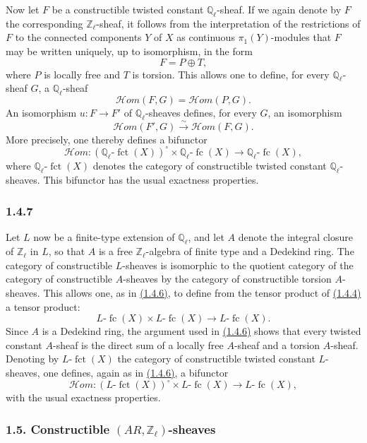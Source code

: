 \documentclass[11pt]{article}
\providecommand{\fct}{\operatorname{fct}}
\providecommand{\cHom}{\mathcal{H}om}
\providecommand{\fc}{\operatorname{fc}}
\begin{document}
Now let \(F\) be a constructible twisted constant \(\mathbb Q_\ell\)-sheaf. If we again denote by \(F\) the corresponding \(\mathbb Z_\ell\)-sheaf, it follows from the interpretation of the restrictions of \(F\) to the connected components \(Y\) of \(X\) as continuous \(\pi_1(Y)\)-modules that \(F\) may be written uniquely, up to isomorphism, in the form
\[
F=P\oplus T,
\]
where \(P\) is locally free and \(T\) is torsion. This allows one to define, for every \(\mathbb Q_\ell\)-sheaf \(G\), a \(\mathbb Q_\ell\)-sheaf
\[
\cHom(F,G)=\cHom(P,G).
\]
An isomorphism \(u:F\to F'\) of \(\mathbb Q_\ell\)-sheaves defines, for every \(G\), an isomorphism
\[
\cHom(F',G)\xrightarrow{\sim}\cHom(F,G).
\]
More precisely, one thereby defines a bifunctor
\[
\cHom:(\mathbb Q_\ell\text{-}\fct(X))^\circ\times \mathbb Q_\ell\text{-}\fc(X)
\longrightarrow \mathbb Q_\ell\text{-}\fc(X),
\]
where \(\mathbb Q_\ell\text{-}\fct(X)\) denotes the category of constructible twisted constant \(\mathbb Q_\ell\)-sheaves. This bifunctor has the usual exactness properties.

\subsubsection*{1.4.7}\label{sga5:VI:subsubsection:1.4.7}
Let \(L\) now be a finite-type extension of \(\mathbb Q_\ell\), and let \(A\) denote the integral closure of \(\mathbb Z_\ell\) in \(L\), so that \(A\) is a free \(\mathbb Z_\ell\)-algebra of finite type and a Dedekind ring. The category of constructible \(L\)-sheaves is isomorphic to the quotient category of the category of constructible \(A\)-sheaves by the category of constructible torsion \(A\)-sheaves. This allows one, as in \hyperref[sga5:VI:subsubsection:1.4.6]{(1.4.6)}, to define from the tensor product of \hyperref[sga5:VI:subsubsection:1.4.4]{(1.4.4)} a tensor product:
\[
L\text{-}\fc(X)\times L\text{-}\fc(X)\longrightarrow L\text{-}\fc(X).
\]
Since \(A\) is a Dedekind ring, the argument used in \hyperref[sga5:VI:subsubsection:1.4.6]{(1.4.6)} shows that every twisted constant \(A\)-sheaf is the direct sum of a locally free \(A\)-sheaf and a torsion \(A\)-sheaf. Denoting by \(L\text{-}\fct(X)\) the category of constructible twisted constant \(L\)-sheaves, one defines, again as in \hyperref[sga5:VI:subsubsection:1.4.6]{(1.4.6)}, a bifunctor
\[
\cHom:(L\text{-}\fct(X))^\circ\times L\text{-}\fc(X)
\longrightarrow L\text{-}\fc(X),
\]
with the usual exactness properties.

\subsubsection*{1.5. Constructible \((AR,\mathbb Z_\ell)\)-sheaves}\label{sga5:VI:subsubsection:1.5}
\end{document}
